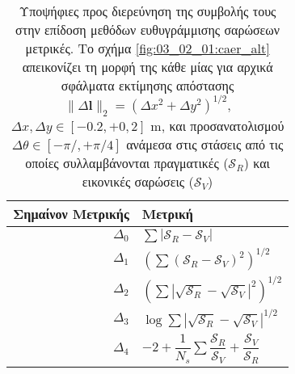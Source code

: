 \begin{table}\centering
  \renewcommand{\arraystretch}{1.5}
  \begin{tabular}{r|l}                                                                                                         \toprule
  Σημαίνον Μετρικής & Μετρική                                                                                               \\ \midrule
  $\Delta_0$        & $\sum |\mathcal{S}_R-\mathcal{S}_V|$                                                                  \\
  $\Delta_1$        & $(\sum (\mathcal{S}_R-\mathcal{S}_V)^2)^{1/2}$                                                        \\
  $\Delta_2$        & $(\sum |\sqrt{\mathcal{S}_R}-\sqrt{\mathcal{S}_V}|^2)^{1/2}$                                          \\
  $\Delta_3$        & $\log\sum |\sqrt{\mathcal{S}_R}-\sqrt{\mathcal{S}_V}|^{1/2}$                                          \\
  $\Delta_4$        & $-2 + \dfrac{1}{N_s}\sum \dfrac{\mathcal{S}_R}{\mathcal{S}_V} + \dfrac{\mathcal{S}_V}{\mathcal{S}_R}$ \\ \bottomrule
  \end{tabular}
  \caption{\small Υποψήφιες προς διερεύνηση της συμβολής τους στην επίδοση
           μεθόδων ευθυγράμμισης σαρώσεων μετρικές. Το σχήμα
           \ref{fig:03_02_01:caer_alt} απεικονίζει τη μορφή της κάθε μίας για
           αρχικά σφάλματα εκτίμησης απόστασης
           $\|\Delta \bm{l}\|_2 = (\Delta x^2 + \Delta y^2)^{1/2}$,
           $\Delta x, \Delta y \in [-0.2, +0,2]$ m, και προσανατολισμού
           $\Delta \theta \in [-\pi/, +\pi/4]$ ανάμεσα στις στάσεις από τις
           οποίες συλλαμβάνονται πραγματικές ($\mathcal{S}_R$) και
           εικονικές σαρώσεις ($\mathcal{S}_V$)}
  \label{tbl:03_02_01:caer_alt}
\end{table}
